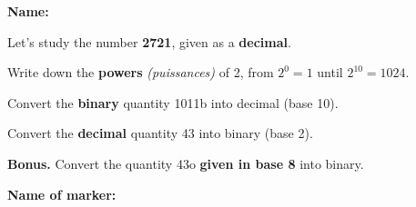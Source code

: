 \documentclass[12pt]{exam}
\begin{document}
\textbf{Name:} \dotfill

\begin{questions}

\question[3] Let's study the number \textbf{2721}, given as a \textbf{decimal}.

\question[2] Write down the \textbf{powers} \emph{(puissances)} of 2, from $2^0=1$ until $2^{10}=1024$.
\fillwithdottedlines{21mm}

\question[2] Convert the \textbf{binary} quantity 1011b into decimal (base 10).
\fillwithdottedlines{14mm}

\question[2]  Convert the \textbf{decimal} quantity 43 into binary (base 2).
\fillwithdottedlines{28mm}

\question \textbf{Bonus.} Convert the quantity 43o \textbf{given in base 8} into binary.
\fillwithdottedlines{28mm}

\end{questions}

\vfill

\begin{tcolorbox}

\textbf{Name of marker:}

\begin{center}
\gradetable[h][questions]
\end{center}

\end{tcolorbox}
\end{document}
